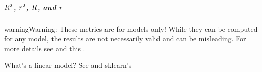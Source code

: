 \documentclass[letterpaper,10pt,english]{jupyterBook}
\begin{document}
\subparagraph{\protect\(R^{2}\protect\), \protect\(r^{2}\protect\), \protect\(R\protect\), and \protect\(r\protect\)}
\label{\detokenize{task2_c/example_sup_reg/sup_reg_ex_accuracy:r-2-r-2-r-and-r}}\label{\detokenize{task2_c/example_sup_reg/sup_reg_ex_accuracy:sup-reg-ex-develop-accuracy-r}}
\begin{sphinxadmonition}{warning}{Warning:}
\sphinxAtStartPar
These metrics are for  models only! While they can be computed for any model, the results are not necessarily valid and can be misleading. For more details see  and this .

\sphinxAtStartPar
What’s a linear model? See  and sklearn’s 
\end{sphinxadmonition}
\end{document}
